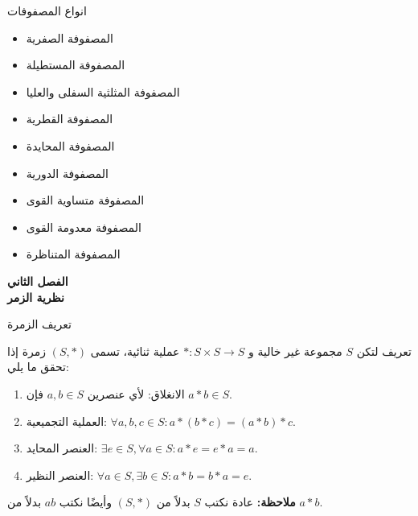 		\begin{frame}{انواع المصفوفات}
			\begin{itemize}
				\item المصفوفة الصفرية
				\item  المصفوفة المستطيلة
				\item المصفوفة المثلثية السفلى والعليا
				\item المصفوفة القطرية
				\item المصفوفة المحايدة
				\item المصفوفة الدورية
				\item المصفوفة متساوية القوى
				\item المصفوفة معدومة القوى
				\item المصفوفة المتناظرة
			\end{itemize}
		\end{frame}
		
		\begin{frame}
			\begin{center}\Huge
				\textbf{الفصل الثاني}\\
				\textbf{نظرية الزمر}
			\end{center}
		\end{frame}
		
		\begin{frame}{تعريف الزمرة}
			\begin{exampleblock}{تعريف}
				لتكن $S$ مجموعة غير خالية و $*:S\times S\to S$ عملية ثنائية، تسمى $(S, *)$ زمرة إذا تحقق ما يلي:
				\begin{enumerate}
					\item الانغلاق: لأي عنصرين $a, b\in S$ فإن $a*b\in S$.
					\item العملية التجميعية: $\forall a, b, c\in S: a*(b*c) = (a*b)*c$.
					\item العنصر المحايد: $\exists e\in S, \forall a\in S: a*e = e*a = a$.
					\item العنصر النظير: $\forall a\in S, \exists b\in S: a*b = b*a = e$.
				\end{enumerate}
				
	\textbf{ملاحظة:} عادة نكتب $S$ بدلاً من $(S, *)$ وأيضًا نكتب $ab$ بدلاً من $a*b$.
			\end{exampleblock}
		\end{frame}
		

